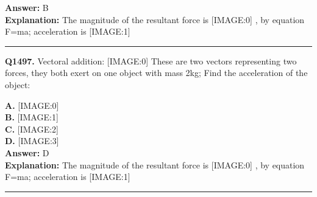 \documentclass[12pt]{article}
\begin{document}
\textbf{Answer:} B \\
\textbf{Explanation:} The magnitude of the resultant force is
[IMAGE:0]
, by equation F=ma; acceleration is
[IMAGE:1]

\hrule
\vspace{1em}


\noindent
\textbf{Q1497.} Vectoral addition:
[IMAGE:0]
These are two vectors representing two forces, they both exert on one object with mass 2kg; Find the acceleration of the object:



\textbf{A.} [IMAGE:0] \\
\textbf{B.} [IMAGE:1] \\
\textbf{C.} [IMAGE:2] \\
\textbf{D.} [IMAGE:3] \\

\textbf{Answer:} D \\
\textbf{Explanation:} The magnitude of the resultant force is
[IMAGE:0]
, by equation F=ma; acceleration is
[IMAGE:1]

\hrule
\vspace{1em}
\end{document}
